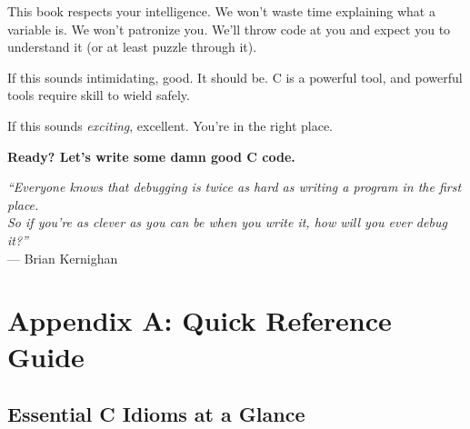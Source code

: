 \documentclass[11pt,openany]{book}
\begin{document}
This book respects your intelligence. We won't waste time explaining what a variable is. We won't patronize you. We'll throw code at you and expect you to understand it (or at least puzzle through it).

If this sounds intimidating, good. It should be. C is a powerful tool, and powerful tools require skill to wield safely.

If this sounds \textit{exciting}, excellent. You're in the right place.

\vspace{1em}

\textbf{Ready? Let's write some damn good C code.}

\vspace{2em}

\begin{center}
\textit{``Everyone knows that debugging is twice as hard as writing a program in the first place.\\
So if you're as clever as you can be when you write it, how will you ever debug it?''}\\
\vspace{0.5em}
--- Brian Kernighan
\end{center}

\mainmatter




















\backmatter

\chapter{Appendix A: Quick Reference Guide}

\section*{Essential C Idioms at a Glance}
\end{document}
